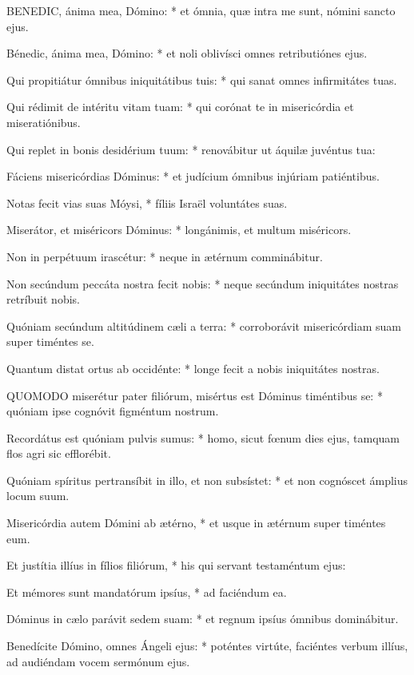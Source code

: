 
\lettrine[lines=2]{B}{ENEDIC}, ánima mea, Dómino: * et ómnia, quæ intra me sunt, nómini sancto ejus.

Bénedic, ánima mea, Dómino: * et noli oblivísci omnes retributiónes ejus.

Qui propitiátur ómnibus iniquitátibus tuis: * qui sanat omnes infirmitátes tuas.

Qui rédimit de intéritu vitam tuam: * qui corónat te in misericórdia et miseratiónibus.

Qui replet in bonis desidérium tuum: * renovábitur ut áquilæ juvéntus tua:

Fáciens misericórdias Dóminus: * et judícium ómnibus injúriam patiéntibus.

Notas fecit vias suas Móysi, * fíliis Israël voluntátes suas.

Miserátor, et miséricors Dóminus: * longánimis, et multum miséricors.

Non in perpétuum irascétur: * neque in ætérnum comminábitur.

Non secúndum peccáta nostra fecit nobis: * neque secúndum iniquitátes nostras retríbuit nobis.

Quóniam secúndum altitúdinem cæli a terra: * corroborávit misericórdiam suam super timéntes se.

Quantum distat ortus ab occidénte: * longe fecit a nobis iniquitátes nostras.


\lettrine[lines=2]{Q}{UOMODO} miserétur pater filiórum, misértus est Dóminus timéntibus se: * quóniam ipse cognóvit figméntum nostrum.

Recordátus est quóniam pulvis sumus: * homo, sicut fœnum dies ejus, tamquam flos agri sic efflorébit.

Quóniam spíritus pertransíbit in illo, et non subsístet: * et non cognóscet ámplius locum suum.

Misericórdia autem Dómini ab ætérno, * et usque in ætérnum super timéntes eum.

Et justítia illíus in fílios filiórum, * his qui servant testaméntum ejus:

Et mémores sunt mandatórum ipsíus, * ad faciéndum ea.

Dóminus in cælo parávit sedem suam: * et regnum ipsíus ómnibus dominábitur.

Benedícite Dómino, omnes Ángeli ejus: * poténtes virtúte, faciéntes verbum illíus, ad audiéndam vocem sermónum ejus.

